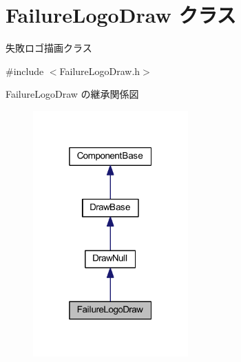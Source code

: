 \hypertarget{class_failure_logo_draw}{}\section{Failure\+Logo\+Draw クラス}
\label{class_failure_logo_draw}


失敗ロゴ描画クラス  




{\ttfamily \#include $<$Failure\+Logo\+Draw.\+h$>$}



Failure\+Logo\+Draw の継承関係図\nopagebreak
\begin{figure}[H]
\begin{center}
\leavevmode
\includegraphics[width=169pt]{class_failure_logo_draw__inherit__graph}
\end{center}
\end{figure}
